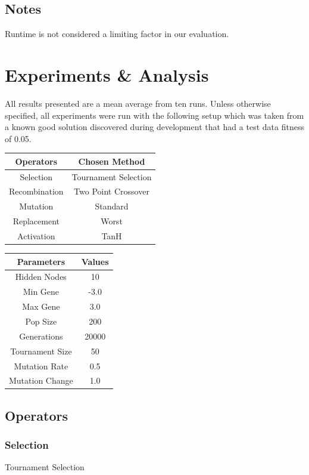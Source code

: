 \documentclass[sigconf]{acmart}
\begin{document}
\subsection{Notes}
Runtime is not considered a limiting factor in our evaluation.
\section{Experiments \& Analysis}
All results presented are a mean average from ten runs. Unless otherwise specified, all experiments were run with the following setup which was taken from a known good solution discovered during development that had a test data fitness of 0.05.

\begin{center}
\begin{tabular} {|c|c|}
\hline
Operators & Chosen Method \\
\hline
Selection & Tournament Selection \\
Recombination & Two Point Crossover \\
Mutation & Standard \\
Replacement & Worst \\
Activation & TanH \\
\hline
\end{tabular}
\end{center}
\begin{center}
\begin{tabular} {|c|c|}
\hline
Parameters & Values \\
\hline
Hidden Nodes & 10 \\
Min Gene & -3.0 \\
Max Gene & 3.0 \\
Pop Size & 200 \\
Generations & 20000 \\
Tournament Size & 50 \\
Mutation Rate & 0.5 \\
Mutation Change & 1.0 \\

\hline

\end{tabular}
\end{center}

\subsection{Operators}
\subsubsection{Selection}
Tournament Selection
\end{document}
